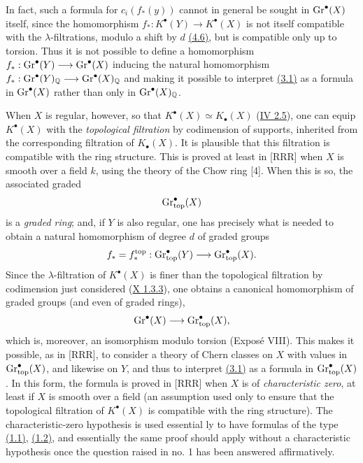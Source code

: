 In fact, such a formula for $c_i(f_*(y))$ cannot in general be sought in $\operatorname{Gr}^\bullet(X)$ itself, since the homomorphism $f_*:K^\bullet(Y)\longrightarrow K^\bullet(X)$ is not itself compatible with the $\lambda$-filtrations, modulo a shift by $d$ \hyperlink{sga6.e14.para.4-6}{(4.6)}, but is compatible only up to torsion. Thus it is not possible to define a homomorphism $f_*:\operatorname{Gr}^\bullet(Y)\longrightarrow\operatorname{Gr}^\bullet(X)$ inducing the natural homomorphism $f_*:\operatorname{Gr}^\bullet(Y)_{\mathbb Q}\longrightarrow\operatorname{Gr}^\bullet(X)_{\mathbb Q}$ and making it possible to interpret \hyperlink{sga6.e14.eq.3-1}{(3.1)} as a formula in $\operatorname{Gr}^\bullet(X)$ rather than only in $\operatorname{Gr}^\bullet(X)_{\mathbb Q}$.

When $X$ is regular, however, so that $K^\bullet(X)\simeq K_\bullet(X)$ (\hyperlink{sga6.e04.para.2-5}{IV 2.5}), one can equip $K^\bullet(X)$ with the \emph{topological filtration} by codimension of supports, inherited from the corresponding filtration of $K_\bullet(X)$. It is plausible that this filtration is compatible with the ring structure. This is proved at least in [RRR] when $X$ is smooth over a field $k$, using the theory of the Chow ring [4]. When this is so, the associated graded
\[
  \operatorname{Gr}_{\mathrm{top}}^\bullet(X)
\]
is a \emph{graded ring}; and, if $Y$ is also regular, one has precisely what is needed to obtain a natural homomorphism of degree $d$ of graded groups
\[
  f_*=f_*^{\mathrm{top}}:\operatorname{Gr}_{\mathrm{top}}^\bullet(Y)
  \longrightarrow\operatorname{Gr}_{\mathrm{top}}^\bullet(X).
\]
Since the $\lambda$-filtration of $K^\bullet(X)$ is finer than the topological filtration by codimension just considered (\hyperlink{sga6.e10.cor.1-3-3}{X 1.3.3}), one obtains a canonical homomorphism of graded groups (and even of graded rings),
\[
  \operatorname{Gr}^\bullet(X)\longrightarrow\operatorname{Gr}_{\mathrm{top}}^\bullet(X),
\]
which is, moreover, an isomorphism modulo torsion (Expos\'e VIII). This makes it possible, as in [RRR], to consider a theory of Chern classes on $X$ with values in $\operatorname{Gr}_{\mathrm{top}}^\bullet(X)$, and likewise on $Y$, and thus to interpret \hyperlink{sga6.e14.eq.3-1}{(3.1)} as a formula in $\operatorname{Gr}_{\mathrm{top}}^\bullet(X)$. In this form, the formula is proved in [RRR] when $X$ is of \emph{characteristic zero}, at least if $X$ is smooth over a field (an assumption used only to ensure that the topological filtration of $K^\bullet(X)$ is compatible with the ring structure). The characteristic-zero hypothesis is used essential%
ly to have formulas of the type \hyperlink{sga6.e14.eq.1-1}{(1.1)}, \hyperlink{sga6.e14.eq.1-2}{(1.2)}, and essentially the same proof should apply without a characteristic hypothesis once the question raised in no. 1 has been answered affirmatively.

